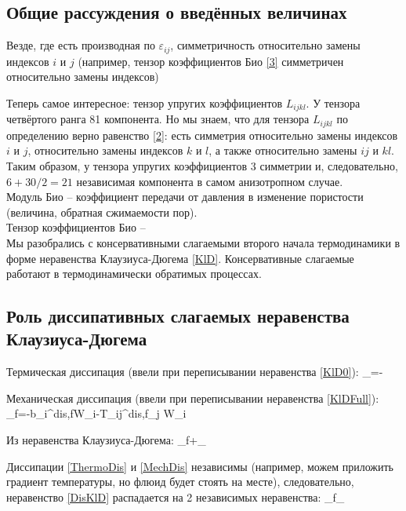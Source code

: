 \documentclass[main.tex]{subfiles}
\begin{document}
\subsection{Общие рассуждения о введённых величинах}
Везде, где есть производная по $\varepsilon_{ij}$, симметричность относительно замены индексов $i$ и $j$ (например, тензор коэффициентов Био \eqref{3} симметричен относительно замены индексов)

Теперь самое интересное: тензор упругих коэффициентов $L_{ijkl}$. У тензора четвёртого ранга 81 компонента. Но мы знаем, что для тензора $L_{ijkl}$ по определению верно равенство \eqref{2}: есть симметрия относительно замены индексов $i$ и $j$, относительно замены индексов $k$ и $l$, а также относительно замены $ij$ и $kl$. Таким образом, у тензора упругих коэффициентов 3 симметрии и, следовательно, $6+30/2=21$ независимая компонента в самом анизотропном случае.\\

Модуль Био -- коэффициент передачи от давления в изменение пористости (величина, обратная сжимаемости пор).\\

Тензор коэффициентов Био -- \\


Мы разобрались с консервативными слагаемыми второго начала термодинамики в форме неравенства Клаузиуса-Дюгема \eqref{KlD}. Консервативные слагаемые работают в термодинамически обратимых процессах.

\subsection{Роль диссипативных слагаемых неравенства Клаузиуса-Дюгема}

Термическая диссипация (ввели при переписывании неравенства \eqref{KlD0}):
\beq\label{ThermoDis}
\delta_\theta=-
\eeq

Механическая диссипация (ввели при переписывании неравенства \eqref{KlDFull}):
\beq\label{MechDis}
\delta_f=-b_i^{dis,f}W_i-T_{ij}^{dis,f}\partial_j W_i
\eeq

Из неравенства Клаузиуса-Дюгема:
\beq\label{DisKlD}
\delta_f+\delta_\theta{}
\eeq

Диссипации \eqref{ThermoDis} и \eqref{MechDis} независимы (например, можем приложить градиент температуры, но флюид будет стоять на месте), следовательно, неравенство \eqref{DisKlD} распадается на 2 независимых неравенства:
\beq\label{2InEq}
\delta_f\delta_\theta{}
\eeq
\end{document}

